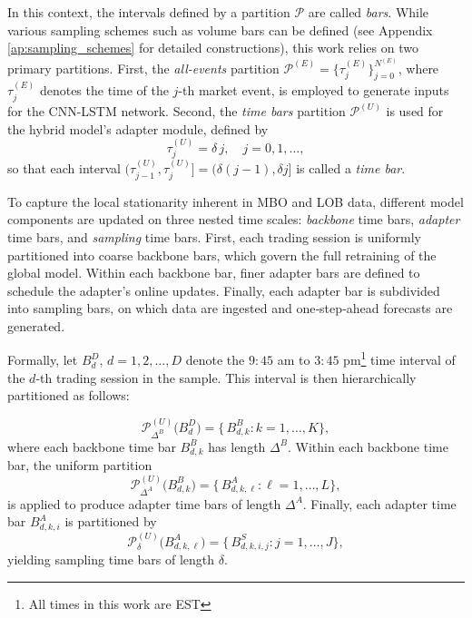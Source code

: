 \documentclass{rQUF2e}
\theoremstyle{plain}
\theoremstyle{definition}
\theoremstyle{remark}
\begin{document}
In this context, the intervals defined by a partition \(\mathcal{P}\) are called \emph{bars}. While various sampling schemes such as volume bars can be defined (see Appendix \ref{ap:sampling_schemes} for detailed constructions), this work relies on two primary partitions. First, the \emph{all-events} partition \(\mathcal{P}^{(E)} = \{\tau^{(E)}_j\}_{j=0}^{N^{(E)}}\), where \(\tau^{(E)}_j\) denotes the time of the \(j\)-th market event, is employed to generate inputs for the CNN-LSTM network. Second, the \emph{time bars} partition \(\mathcal{P}^{(U)}\) is used for the hybrid model's adapter module, defined by
\[
    \tau^{(U)}_j=\delta\,j,\quad j=0,1,\dots,
\]
so that each interval \((\tau^{(U)}_{j-1},\tau^{(U)}_j]=(\delta(j-1),\delta j]\) is called a \emph{time bar}.

To capture the local stationarity inherent in MBO and LOB data, different model components are updated on three nested time scales: \emph{backbone} time bars, \emph{adapter} time bars, and \emph{sampling} time bars.  First, each trading session is uniformly partitioned into coarse backbone bars, which govern the full retraining of the global model.  Within each backbone bar, finer adapter bars are defined to schedule the adapter’s online updates. Finally, each adapter bar is subdivided into sampling bars, on which data are ingested and one‐step‐ahead forecasts are generated.

Formally, let $B^D_d$, $d = 1, 2, \dots, D$ denote the $9:45$ am to $3:45$ pm\footnote{All times in this work are EST} time interval of the $d$-th trading session in the sample. This interval is then hierarchically partitioned as follows:

\[
    \mathcal P^{(U)}_{\Delta^B}\bigl(B^D_d\bigr)
    =\{\,B^B_{d,k}:k=1,\dots,K\},
\]
where each backbone time bar \(B^B_{d,k}\) has length \(\Delta^B\).  Within each backbone time bar, the uniform partition
\[
    \mathcal P^{(U)}_{\Delta^A}\bigl(B^B_{d,k}\bigr)
    =\{\,B^A_{d,k,\ell}:\ell=1,\dots,L\},
\]
is applied to produce adapter time bars of length \(\Delta^A\).  Finally, each adapter time bar \(B^A_{d,k,i}\) is partitioned by
\[
    \mathcal P^{(U)}_{\delta}\bigl(B^A_{d,k,\ell}\bigr)
    =\{\,B^S_{d,k,i,j}:j=1,\dots,J\},
\]
yielding sampling time bars of length \(\delta\).

\end{document}
